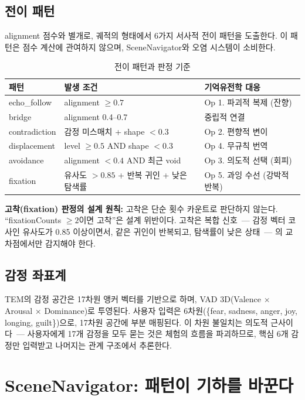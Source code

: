 \documentclass[11pt, a4paper]{article}
\begin{document}
\subsection{전이 패턴}

alignment 점수와 별개로, 궤적의 형태에서 6가지 서사적 전이 패턴을 도출한다. 이 패턴은 점수 계산에 관여하지 않으며, SceneNavigator와 오염 시스템이 소비한다.

\begin{table}[htbp]
\centering
\small
\begin{tabular}{p{2.5cm}p{5cm}p{5cm}}
\toprule
\textbf{패턴} & \textbf{발생 조건} & \textbf{기억유전학 대응} \\
\midrule
echo\_follow & alignment $\geq 0.7$ & Op 1. 파괴적 복제 (잔향) \\
bridge & alignment 0.4--0.7 & 중립적 연결 \\
contradiction & 감정 미스매치 + shape $< 0.3$ & Op 2. 편향적 변이 \\
displacement & level $\geq 0.5$ AND shape $< 0.3$ & Op 4. 무규칙 번역 \\
avoidance & alignment $< 0.4$ AND 최근 void & Op 3. 의도적 선택 (회피) \\
fixation & 유사도 $> 0.85$ + 반복 귀인 + 낮은 탐색률 & Op 5. 과잉 수선 (강박적 반복) \\
\bottomrule
\end{tabular}
\caption{전이 패턴과 판정 기준}
\label{tab:patterns}
\end{table}

\textbf{고착(fixation) 판정의 설계 원칙:} 고착은 단순 횟수 카운트로 판단하지 않는다. ``fixationCounts $\geq 2$이면 고착''은 설계 위반이다. 고착은 복합 신호~--- 감정 벡터 코사인 유사도가 0.85 이상이면서, 같은 귀인이 반복되고, 탐색률이 낮은 상태~--- 의 교차점에서만 감지해야 한다.

\subsection{감정 좌표계}

TEM의 감정 공간은 17차원 앵커 벡터를 기반으로 하며, VAD 3D(Valence $\times$ Arousal $\times$ Dominance)로 투영된다. 사용자 입력은 6차원(\{fear, sadness, anger, joy, longing, guilt\})으로, 17차원 공간에 부분 매핑된다. 이 차원 불일치는 의도적 근사이다~--- 사용자에게 17개 감정을 모두 묻는 것은 체험의 흐름을 파괴하므로, 핵심 6개 감정만 입력받고 나머지는 관계 구조에서 추론한다.


\section{SceneNavigator: 패턴이 기하를 바꾼다}
\end{document}
